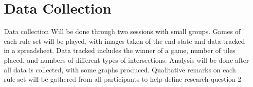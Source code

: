 \documentclass{article}
\begin{document}
\section{Data Collection}
Data collection Will be done through two sessions with small groups. Games of each rule set will be played, with images taken of the end state and data tracked in a spreadsheet. Data tracked includes the winner of a game, number of tiles placed, and numbers of different types of intersections. Analysis will be done after all data is collected, with some graphs produced. Qualitative remarks on each rule set will be gathered from all participants to help define research question 2




\end{document}
